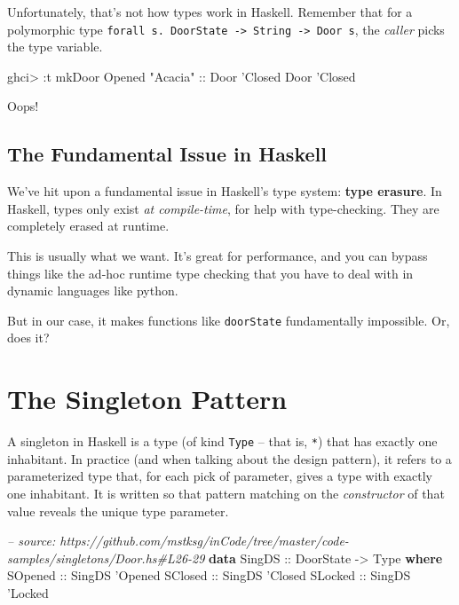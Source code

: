 \documentclass[]{article}
\newenvironment{Shaded}{}{}
\newcommand{\KeywordTok}[1]{\textcolor[rgb]{0.00,0.44,0.13}{\textbf{#1}}}
\newcommand{\DataTypeTok}[1]{\textcolor[rgb]{0.56,0.13,0.00}{#1}}
\newcommand{\CharTok}[1]{\textcolor[rgb]{0.25,0.44,0.63}{#1}}
\newcommand{\StringTok}[1]{\textcolor[rgb]{0.25,0.44,0.63}{#1}}
\newcommand{\CommentTok}[1]{\textcolor[rgb]{0.38,0.63,0.69}{\textit{#1}}}
\newcommand{\OtherTok}[1]{\textcolor[rgb]{0.00,0.44,0.13}{#1}}
\newcommand{\FunctionTok}[1]{\textcolor[rgb]{0.02,0.16,0.49}{#1}}
\newcommand{\NormalTok}[1]{#1}
\begin{document}
Unfortunately, that's not how types work in Haskell. Remember that for a
polymorphic type
\texttt{forall\ s.\ DoorState\ -\textgreater{}\ String\ -\textgreater{}\ Door\ s},
the \emph{caller} picks the type variable.

\begin{Shaded}
\begin{Highlighting}[]
\NormalTok{ghci}\FunctionTok{>} \FunctionTok{:}\NormalTok{t mkDoor }\DataTypeTok{Opened} \StringTok{"Acacia"}\OtherTok{ ::} \DataTypeTok{Door} \CharTok{'Closed}
\DataTypeTok{Door} \CharTok{'Closed}
\end{Highlighting}
\end{Shaded}

Oops!

\subsection{The Fundamental Issue in
Haskell}\label{the-fundamental-issue-in-haskell}

We've hit upon a fundamental issue in Haskell's type system: \textbf{type
erasure}. In Haskell, types only exist \emph{at compile-time}, for help with
type-checking. They are completely erased at runtime.

This is usually what we want. It's great for performance, and you can bypass
things like the ad-hoc runtime type checking that you have to deal with in
dynamic languages like python.

But in our case, it makes functions like \texttt{doorState} fundamentally
impossible. Or, does it?

\section{The Singleton Pattern}\label{the-singleton-pattern}

A singleton in Haskell is a type (of kind \texttt{Type} -- that is, \texttt{*})
that has exactly one inhabitant. In practice (and when talking about the design
pattern), it refers to a parameterized type that, for each pick of parameter,
gives a type with exactly one inhabitant. It is written so that pattern matching
on the \emph{constructor} of that value reveals the unique type parameter.

\begin{Shaded}
\begin{Highlighting}[]
\CommentTok{-- source: https://github.com/mstksg/inCode/tree/master/code-samples/singletons/Door.hs#L26-29}
\KeywordTok{data} \DataTypeTok{SingDS}\OtherTok{ ::} \DataTypeTok{DoorState} \OtherTok{->} \DataTypeTok{Type} \KeywordTok{where}
    \DataTypeTok{SOpened}\OtherTok{ ::} \DataTypeTok{SingDS} \CharTok{'Opened}
    \DataTypeTok{SClosed}\OtherTok{ ::} \DataTypeTok{SingDS} \CharTok{'Closed}
    \DataTypeTok{SLocked}\OtherTok{ ::} \DataTypeTok{SingDS} \CharTok{'Locked}
\end{Highlighting}
\end{Shaded}
\end{document}
